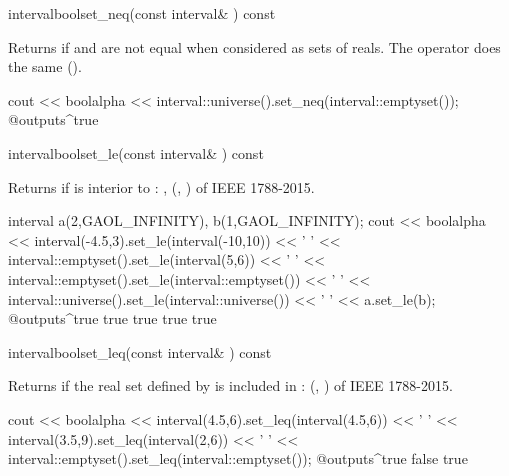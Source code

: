 \begin{defmethod}{interval}{bool}{set\_neq}{(const interval\& ) const}
    \begin{operation}
    \end{operation}
    Returns  if  and  are not equal when
    considered as sets of reals. The operator \code{!=} does the same
    ().\newinvfive
    \begin{example}
cout << boolalpha << interval::universe().set_neq(interval::emptyset());
@outputs^true~
    \end{example}
\end{defmethod}

\begin{defmethod}{interval}{bool}{set\_le}{(const interval\& ) const}
  \begin{operation}
  \end{operation}
  Returns  if  is interior to :
  , (,
  ) of IEEE 1788-2015.\newinvfive
\begin{example}
interval a(2,GAOL_INFINITY), b(1,GAOL_INFINITY);
cout << boolalpha << interval(-4.5,3).set_le(interval(-10,10)) << ' '
     << interval::emptyset().set_le(interval(5,6)) << ' '
     << interval::emptyset().set_le(interval::emptyset()) << ' '
     << interval::universe().set_le(interval::universe()) << ' '
     << a.set_le(b);
@outputs^true true true true true~
\end{example}
\end{defmethod}

\begin{defmethod}{interval}{bool}{set\_leq}{(const interval\& ) const}
  \begin{operation}
  \end{operation}
  Returns  if the real set defined by  is included in
  : (, ) of IEEE 1788-2015.
\begin{example}
cout << boolalpha << interval(4.5,6).set_leq(interval(4.5,6)) << ' '
     << interval(3.5,9).set_leq(interval(2,6)) << ' '
     << interval::emptyset().set_leq(interval::emptyset());
@outputs^true false true~
\end{example}
\end{defmethod}


